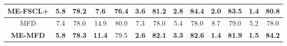 \begin{table}[ht]
\begin{tabular}{c||c|c||c|c||c|c||c|c||c|c||c|c}
\textbf{ME-FSCL+}     & \textbf{5.8}  & 78.2          & \textbf{7.6}  & 76.4           & \textbf{3.6} & 81.2          & \textbf{2.8} & \textbf{84.4} & \textbf{2.0} & \textbf{83.5} & \textbf{1.4} & 80.8          \\ \hline
MFD                   & 7.4           & 78.0          & 14.9          & 80.0           & 7.3          & 78.0          & 5.4          & 78.0          & 8.7          & 79.0          & 5.2          & 78.0          \\ 
\textbf{ME-MFD}       & \textbf{5.8}  & \textbf{78.3} & \textbf{11.4} & 79.5           & \textbf{2.6} & \textbf{82.1} & \textbf{3.3} & \textbf{82.6} & \textbf{1.4} & \textbf{81.9} & \textbf{1.5} & \textbf{84.2} \\ \hline
\end{tabular}
\end{table}